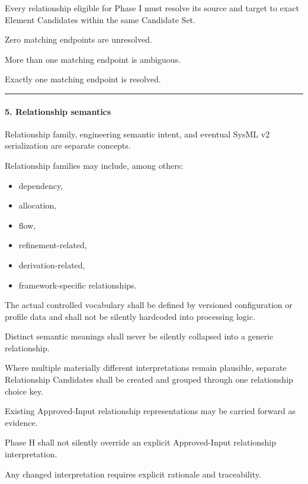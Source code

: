 Every relationship eligible for Phase I must resolve its source and target to exact Element Candidates within the same Candidate Set.

Zero matching endpoints are unresolved.

More than one matching endpoint is ambiguous.

Exactly one matching endpoint is resolved.

\begin{center}\rule{0.5\linewidth}{0.5pt}\end{center}

\hypertarget{5-relationship-semantics}{%
\paragraph{5. Relationship semantics}\label{5-relationship-semantics}}

Relationship family, engineering semantic intent, and eventual SysML v2 serialization are separate concepts.

Relationship families may include, among others:

\begin{itemize}
\tightlist
\item
  dependency,
\item
  allocation,
\item
  flow,
\item
  refinement-related,
\item
  derivation-related,
\item
  framework-specific relationships.
\end{itemize}

The actual controlled vocabulary shall be defined by versioned configuration or profile data and shall not be silently hardcoded into processing logic.

Distinct semantic meanings shall never be silently collapsed into a generic relationship.

Where multiple materially different interpretations remain plausible, separate Relationship Candidates shall be created and grouped through one relationship choice key.

Existing Approved-Input relationship representations may be carried forward as evidence.

Phase H shall not silently override an explicit Approved-Input relationship interpretation.

Any changed interpretation requires explicit rationale and traceability.


